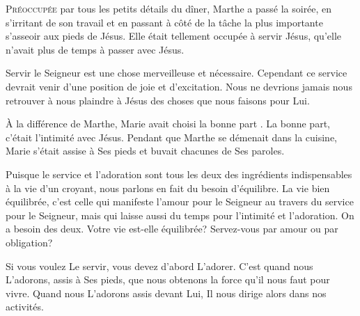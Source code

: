 



\lettrine{P}{réoccupée} par tous les petits détails du dîner,
 Marthe a passé la soirée, en s'irritant de son travail et en passant
 à côté de la tâche la plus importante \ocadr s'asseoir aux pieds de Jésus.
 Elle était tellement occupée à servir Jésus,
 qu'elle n'avait plus de temps à passer avec Jésus.

Servir le Seigneur est une chose merveilleuse et nécessaire.
 Cependant ce service devrait venir d'une position de joie et d'excitation.
 Nous ne devrions jamais nous retrouver à nous plaindre à Jésus
 des choses que nous faisons pour Lui.


À la différence de Marthe, Marie avait choisi \Og la bonne part \Fg{}.
 La bonne part, c'était l'intimité avec Jésus.
 Pendant que Marthe se démenait dans la cuisine,
 Marie s'était assise à Ses pieds et buvait chacunes de Ses paroles.

Puisque le service et l'adoration sont tous les deux des ingrédients
 indispensables à la vie d'un croyant, nous parlons en fait
 du besoin d'équilibre. La vie bien équilibrée, c'est celle qui manifeste
 l'amour pour le Seigneur au travers du service pour le Seigneur,
 mais qui laisse aussi du temps pour l'intimité et l'adoration.
 On a besoin des deux. Votre vie est-elle équilibrée?
 Servez-vous par amour ou par obligation?

Si vous voulez Le servir, vous devez d'abord L'adorer.
 C'est quand nous L'adorons, assis à Ses pieds, que nous obtenons
 la force qu'il nous faut pour vivre.
 Quand nous L'adorons assis devant Lui,
 Il nous dirige alors dans nos activités.

\dvrule



